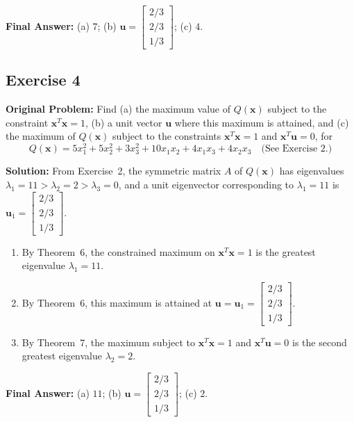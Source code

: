 \documentclass[11pt, letterpaper]{article}
\theoremstyle{definition}
\theoremstyle{remark}
\begin{document}
\textbf{Final Answer:} (a) $7$; (b) $\mathbf{u} = \begin{bmatrix} 2/3 \\ 2/3 \\ 1/3 \end{bmatrix}$; (c) $4$.

\subsection{Exercise 4}
\textbf{Original Problem:} Find (a) the maximum value of $Q(\mathbf{x})$ subject to the constraint $\mathbf{x}^T \mathbf{x} = 1$, (b) a unit vector $\mathbf{u}$ where this maximum is attained, and (c) the maximum of $Q(\mathbf{x})$ subject to the constraints $\mathbf{x}^T \mathbf{x} = 1$ and $\mathbf{x}^T \mathbf{u} = 0$, for
\[
Q(\mathbf{x}) = 5x_1^2 + 5x_2^2 + 3x_3^2 + 10x_1x_2 + 4x_1x_3 + 4x_2x_3 \quad \text{(See Exercise 2.)}
\]

\textbf{Solution:}
From Exercise~2, the symmetric matrix $A$ of $Q(\mathbf{x})$ has eigenvalues $\lambda_1 = 11 > \lambda_2 = 2 > \lambda_3 = 0$, and a unit eigenvector corresponding to $\lambda_1 = 11$ is $\mathbf{u}_1 = \begin{bmatrix} 2/3 \\ 2/3 \\ 1/3 \end{bmatrix}$.
\begin{enumerate}[label=(\alph*)]
    \item By Theorem~6, the constrained maximum on $\mathbf{x}^T \mathbf{x} = 1$ is the greatest eigenvalue $\lambda_1 = 11$.
    \item By Theorem~6, this maximum is attained at $\mathbf{u} = \mathbf{u}_1 = \begin{bmatrix} 2/3 \\ 2/3 \\ 1/3 \end{bmatrix}$.
    \item By Theorem~7, the maximum subject to $\mathbf{x}^T \mathbf{x} = 1$ and $\mathbf{x}^T \mathbf{u} = 0$ is the second greatest eigenvalue $\lambda_2 = 2$.
\end{enumerate}

\textbf{Final Answer:} (a) $11$; (b) $\mathbf{u} = \begin{bmatrix} 2/3 \\ 2/3 \\ 1/3 \end{bmatrix}$; (c) $2$.
\end{document}

